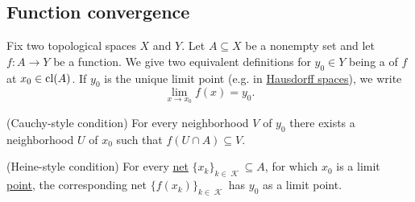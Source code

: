 \subsection{Function convergence}\label{subsec:function_convergence}

\begin{definition}\label{def:local_convergence}
  Fix two topological spaces \( X \) and \( Y \). Let \( A \subseteq X \) be a nonempty set and let \( f: A \to Y \) be a function. We give two equivalent definitions for \( y_0 \in Y \) being a  of \( f \) at \( x_0 \in \operatorname{cl}(A) \). If \( y_0 \) is the unique limit point (e.g. in \hyperref[def:separation_axioms/T2]{Hausdorff spaces}), we write
  \begin{equation*}
    \lim_{x \to x_0} f(x) = y_0.
  \end{equation*}

  \begin{thmenum}
    (Cauchy-style condition) For every neighborhood \( V \) of \( y_0 \) there exists a neighborhood \( U \) of \( x_0 \) such that \( f(U \cap A) \subseteq V \).

    (Heine-style condition) For every \hyperref[def:topological_net]{net} \( \{ x_k \}_{k \in \mscrK} \subseteq A \), for which \( x_0 \) is a limit \hyperref[def:net_convergence/limit]{point}, the corresponding net \( \{ f(x_k) \}_{k \in \mscrK} \) has \( y_0 \) as a limit point.
  \end{thmenum}
\end{definition}
